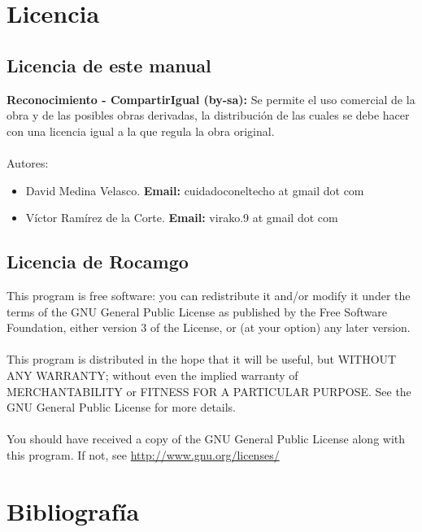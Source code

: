 \documentclass[12pt,a4papert,woside,openright,titlepage,final]{book}
\begin{document}
\chapter{Licencia}

\section{Licencia de este manual}

\textbf{Reconocimiento - CompartirIgual (by-sa):} Se permite el uso comercial de
la obra y de las posibles obras derivadas, la distribución de las cuales se debe
hacer con una licencia igual a la que regula la obra original. \\ \\


Autores: 
\begin{itemize} 
    \item David Medina Velasco. \textbf{Email:} cuidadoconeltecho at gmail dot
    com 
    \item Víctor Ramírez de la Corte. \textbf{Email:} virako.9 at gmail dot com 
\end{itemize}

\section{Licencia de Rocamgo}

This program is free software: you can redistribute it and/or modify it under
the terms of the GNU General Public License as published by the Free Software
Foundation, either version 3 of the License, or (at your option) any later
version. \\ \\ This program is distributed in the hope that it will be useful,
but WITHOUT ANY WARRANTY; without even the implied warranty of MERCHANTABILITY
or FITNESS FOR A PARTICULAR PURPOSE.  See the GNU General Public License for
more details. \\ \\ You should have received a copy of the GNU General Public
License along with this program.  If not, see \url{http://www.gnu.org/licenses/}



\chapter{Bibliografía}
\end{document}
